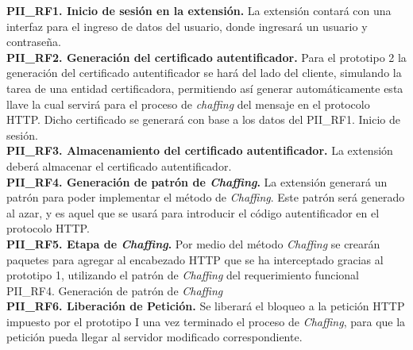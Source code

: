 \documentclass[12pt, a4paper, titlepage]{report}
\begin{document}
				{\setlength{\parindent}{12pt}
				
				\textbf{PII\_RF1. Inicio de sesi\'on en la extensi\'on.} La extensi\'on contar\'a con una interfaz para el ingreso de datos del usuario, donde ingresará un usuario y contraseña. \\   
                
                \textbf{PII\_RF2. Generación del certificado autentificador.} Para el prototipo 2 la generación del certificado autentificador se har\'a del lado del cliente, simulando la tarea de una entidad certificadora, permitiendo as\'i generar automáticamente esta llave la cual servir\'a para el proceso de \textit{chaffing} del mensaje en el protocolo HTTP. Dicho certificado se generará con base a los datos del PII\_RF1. Inicio de sesión.\\
                
                \textbf{PII\_RF3. Almacenamiento del certificado autentificador.} La extensi\'on deberá almacenar el certificado autentificador.\\
                
                \textbf{PII\_RF4. Generación de patrón de \textit{Chaffing}.} La extensión generará un patrón para poder implementar el método de \textit{Chaffing}. Este patrón será generado al azar, y es aquel que se usará para introducir el código autentificador en el protocolo HTTP.\\
                
				\textbf{PII\_RF5. Etapa de \textit{Chaffing}.} Por medio del m\'etodo \textit{Chaffing} se crearán paquetes para agregar al encabezado HTTP que se ha interceptado gracias al prototipo 1, utilizando el patrón de \textit{Chaffing} del requerimiento funcional PII\_RF4. Generación de patrón de \textit{Chaffing}\\
                    
                    
                \textbf{PII\_RF6. Liberaci\'on de Petición.} Se liberar\'a el bloqueo a la petici\'on HTTP impuesto por el prototipo I una vez terminado el proceso de \textit{Chaffing}, para que la petici\'on pueda llegar al servidor modificado correspondiente.\\
                
                
                
		        }
				
\end{document}
